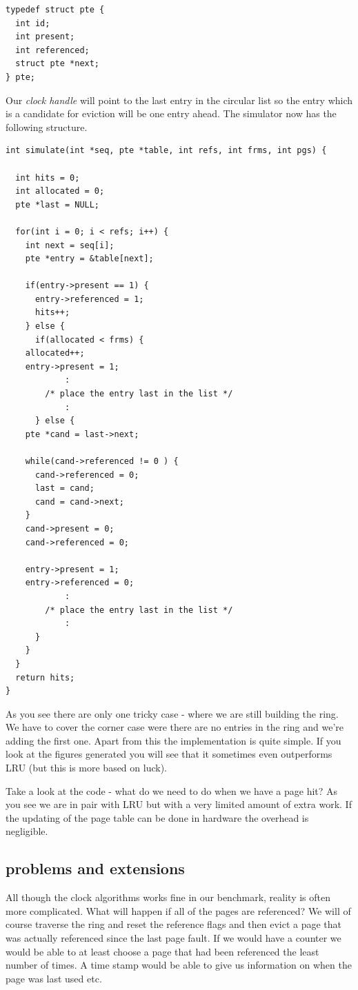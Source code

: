 \documentclass[a4paper,11pt]{article}
\begin{document}
\begin{lstlisting}
typedef struct pte {
  int id;
  int present;
  int referenced;
  struct pte *next;
} pte;
\end{lstlisting}

Our {\em clock handle} will point to the last entry in the circular
list so the entry which is a candidate for eviction will be one entry
ahead. The simulator now has the following structure.

\begin{lstlisting}
int simulate(int *seq, pte *table, int refs, int frms, int pgs) {

  int hits = 0;
  int allocated = 0;
  pte *last = NULL;
	
  for(int i = 0; i < refs; i++) {
    int next = seq[i];
    pte *entry = &table[next];

    if(entry->present == 1) {
      entry->referenced = 1;
      hits++;
    } else {
      if(allocated < frms) {
	allocated++;
	entry->present = 1;
            :
        /* place the entry last in the list */
            :
      } else {
	pte *cand = last->next;

	while(cand->referenced != 0 ) {
	  cand->referenced = 0;
	  last = cand;
	  cand = cand->next;
	}
	cand->present = 0;
	cand->referenced = 0;

	entry->present = 1;
	entry->referenced = 0;	  
            :
        /* place the entry last in the list */
            :
      }
    }
  }
  return hits;
}
\end{lstlisting}

As you see there are only one tricky case - where we are still
building the ring. We have to cover the corner case were there are no
entries in the ring and we're adding the first one. Apart from this
the implementation is quite simple. If you look at the figures
generated you will see that it sometimes even outperforms LRU (but
this is more based on luck). 

Take a look at the code - what do we need to do when we have a page
hit? As you see we are in pair with LRU but with a very limited
amount of extra work. If the updating of the page table can be done
in hardware the overhead is negligible.

\subsection{problems and extensions}

All though the clock algorithms works fine in our benchmark, reality
is often more complicated. What will happen if all of the pages are
referenced? We will of course traverse the ring and reset the
reference flags and then evict a page that was actually referenced
since the last page fault. If we would have a counter we would be able
to at least choose a page that had been referenced the least number of
times. A time stamp would be able to give us information on when the
page was last used etc.
\end{document}
